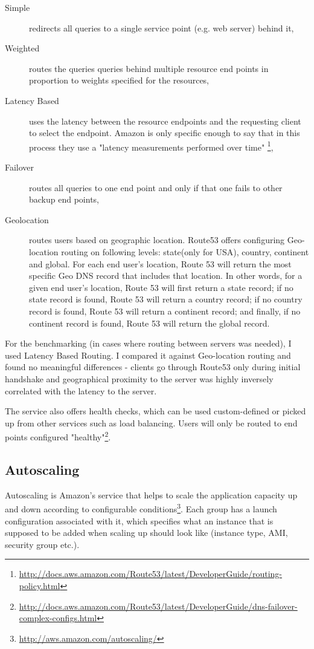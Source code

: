 \documentclass{uvamscse}
\begin{document}
\begin{description}
  \item[Simple] redirects all queries to a single service point (e.g. web server) behind it,
  \item[Weighted] routes the queries queries behind multiple resource end points in proportion to weights specified for the resources,
  \item[Latency Based] uses the latency between the resource endpoints and the requesting client to select the endpoint. Amazon is only specific enough to say that in this process they use a "latency measurements performed over time" \footnote{\url{http://docs.aws.amazon.com/Route53/latest/DeveloperGuide/routing-policy.html}},
  \item[Failover] routes all queries to one end point and only if that one fails to other backup end points,
  \item[Geolocation] routes users based on geographic location. Route53 offers configuring Geo-location routing on following levels: state(only for USA), country, continent and global. For each end user’s location, Route 53 will return the most specific Geo DNS record that includes that location. In other words, for a given end user’s location, Route 53 will first return a state record; if no state record is found, Route 53 will return a country record; if no country record is found, Route 53 will return a continent record; and finally, if no continent record is found, Route 53 will return the global record.
\end{description}

For the benchmarking (in cases where routing between servers was needed), I used Latency Based Routing. I compared it against Geo-location routing and found no meaningful differences - clients go through Route53 only during initial handshake and geographical proximity to the server was highly inversely correlated with the latency to the server.

The service also offers health checks, which can be used custom-defined or picked up from other services such as load balancing. Users will only be routed to end points configured "healthy"\footnote{\url{http://docs.aws.amazon.com/Route53/latest/DeveloperGuide/dns-failover-complex-configs.html}}.

\subsection{Autoscaling}

Autoscaling is Amazon's service that helps to scale the application capacity up and down according to configurable conditions\footnote{\url{http://aws.amazon.com/autoscaling/}}. Each group has a launch configuration associated with it, which specifies what an instance that is supposed to be added when scaling up should look like (instance type, AMI, security group etc.).
\end{document}
